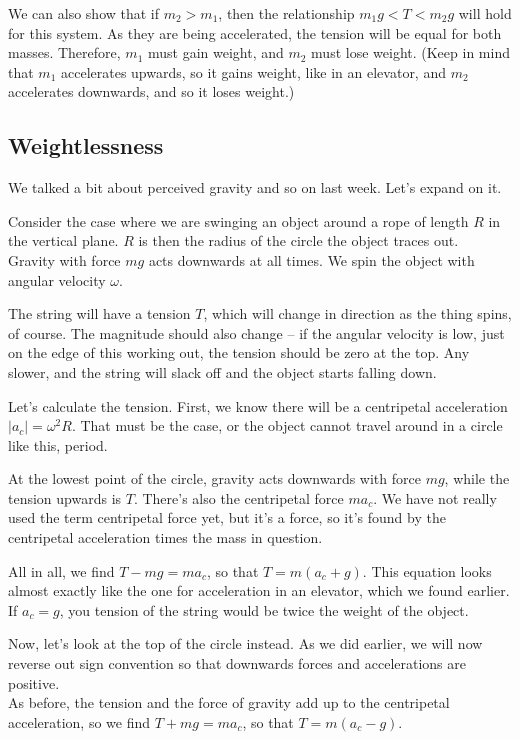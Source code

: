 We can also show that if $m_2 > m_1$, then the relationship $m_1 g < T < m_2 g$ will hold for this system. As they are being accelerated, the tension will be equal for both masses. Therefore, $m_1$ must gain weight, and $m_2$ must lose weight. (Keep in mind that $m_1$ accelerates upwards, so it gains weight, like in an elevator, and $m_2$ accelerates downwards, and so it loses weight.)

\subsection{Weightlessness}

We talked a bit about perceived gravity and so on last week. Let's expand on it.

Consider the case where we are swinging an object around a rope of length $R$ in the vertical plane. $R$ is then the radius of the circle the object traces out.\\
Gravity with force $m g$ acts downwards at all times. We spin the object with angular velocity $\omega$.

The string will have a tension $T$, which will change in direction as the thing spins, of course. The magnitude should also change -- if the angular velocity is low, just on the edge of this working out, the tension should be zero at the top. Any slower, and the string will slack off and the object starts falling down.

Let's calculate the tension. First, we know there will be a centripetal acceleration $|a_c| = \omega^2 R$. That must be the case, or the object cannot travel around in a circle like this, period.

At the lowest point of the circle, gravity acts downwards with force $m g$, while the tension upwards is $T$. There's also the centripetal force $m a_c$. We have not really used the term centripetal force yet, but it's a force, so it's found by the centripetal acceleration times the mass in question.

All in all, we find $T - mg = m a_c$, so that $T = m(a_c + g)$. This equation looks almost exactly like the one for acceleration in an elevator, which we found earlier. If $a_c = g$, you tension of the string would be twice the weight of the object.

Now, let's look at the top of the circle instead. As we did earlier, we will now reverse out sign convention so that downwards forces and accelerations are positive.\\
As before, the tension and the force of gravity add up to the centripetal acceleration, so we find $T + m g = m a_c$, so that $T = m(a_c - g)$.

